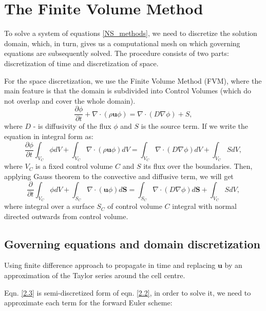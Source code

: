 \section{The Finite Volume Method}
To solve a system of equations \ref{NS_methods}, we need to discretize the solution domain, which, in turn, gives us a computational mesh on which governing equations are subsequently solved. The procedure consists of two parts: discretization of time and discretization of space.

For the space discretization, we use the Finite Volume Method (FVM), where the main feature is that the domain is subdivided into Control Volumes (which do not overlap and cover the whole domain).
\begin{equation}\label{2.2}
\frac{\partial\phi}{\partial t} +\nabla \cdot(\rho\mathbf{u}\phi) = \nabla \cdot(D \nabla \phi) + S ,
\end{equation}
where $D$ -  is diffusivity of the flux $\phi$ and $S$ is the source term. If we write the equation in integral form as:
\begin{equation}
\frac{\partial\phi}{\partial t}  \int_{V_C} \phi d V+\int_{V_C} \nabla \cdot(\rho\mathbf{u}\phi) d V = \int_{V_C} \nabla \cdot(D \nabla \phi) d V + \int_{V_C} S d V,
\end{equation}
where $V_C$ is a fixed control volume $C$ and $S$ its flux over the boundaries. Then, applying Gauss theorem to the convective and diffusive term, we will get
\begin{equation}\label{2.3}
\frac{\partial}{\partial t}\int_{V_C} \phi d V+\int_{S_C} \nabla \cdot(\mathbf{u}\phi) d \mathbf{S} = \int_{S_C} \nabla \cdot(D \nabla \phi) d \mathbf{S} + \int_{V_C} S d V,
\end{equation}
where integral over a surface $S_C$ of control volume $C$ integral with normal directed outwards from control volume.

\subsection{Governing equations and domain discretization}
Using finite difference approach to propagate in time and replacing $\mathbf{u}$ by an approximation of the Taylor series around the cell centre.

Eqn. \ref{2.3} is semi-discretized form of eqn. \ref{2.2}, in order to solve it, we need to approximate each term \cite{ferziger2002cfd} for the forward Euler scheme:

